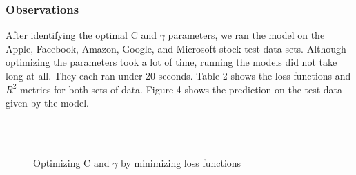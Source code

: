 \usepackage{fancyhdr}\documentclass[conference]{IEEEtran}
\begin{document}
\subsubsection{Observations}
After identifying the optimal C and $\gamma$ parameters, we ran the model on the Apple, Facebook, Amazon, Google, and Microsoft stock test data sets. Although optimizing the parameters took a lot of time, running the models did not take long at all. They each ran under 20 seconds.  Table 2 shows the loss functions and $R^2$ metrics for both sets of data. Figure 4 shows the prediction on the test data given by the model. 
\\
\\
\begin{figure}[h]
    \centering
    \\
    \caption{Optimizing C and $\gamma$ by minimizing loss functions}
    \label{fig:sample_subfigures}
\end{figure}
\end{document}
